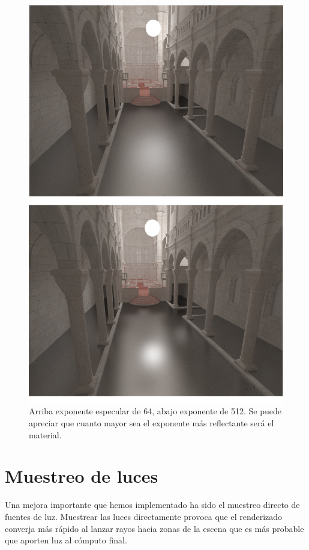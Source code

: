 \begin{figure}
\centering
\includegraphics[width=5in]{compare_specular2_burned.png}
\caption{Arriba exponente especular de 64, abajo exponente de 512. Se puede apreciar que cuanto mayor sea el exponente más reflectante será el material.}
\end{figure}

\clearpage

\section{Muestreo de luces}

Una mejora importante que hemos implementado ha sido el muestreo directo de fuentes de luz. Muestrear las luces directamente provoca que el renderizado converja más rápido al lanzar rayos hacia zonas de la escena que es más probable que aporten luz al cómputo final.

